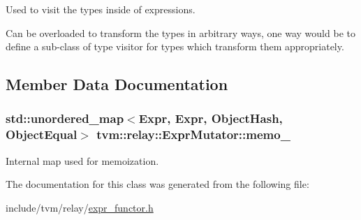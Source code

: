 Used to visit the types inside of expressions. 

Can be overloaded to transform the types in arbitrary ways, one way would be to define a sub-\/class of type visitor for types which transform them appropriately. 

\subsection{Member Data Documentation}
\subsubsection[{\texorpdfstring{memo\+\_\+}{memo_}}]{\setlength{\rightskip}{0pt plus 5cm}std\+::unordered\+\_\+map$<${\bf Expr}, {\bf Expr}, Object\+Hash, Object\+Equal$>$ tvm\+::relay\+::\+Expr\+Mutator\+::memo\+\_\+\hspace{0.3cm}{\ttfamily [protected]}}\hypertarget{classtvm_1_1relay_1_1ExprMutator_a68f3d44397b6070a2ed39f8425b36d3b}{}\label{classtvm_1_1relay_1_1ExprMutator_a68f3d44397b6070a2ed39f8425b36d3b}


Internal map used for memoization. 



The documentation for this class was generated from the following file\+:\begin{DoxyCompactItemize}
\item 
include/tvm/relay/\hyperlink{relay_2expr__functor_8h}{expr\+\_\+functor.\+h}\end{DoxyCompactItemize}

